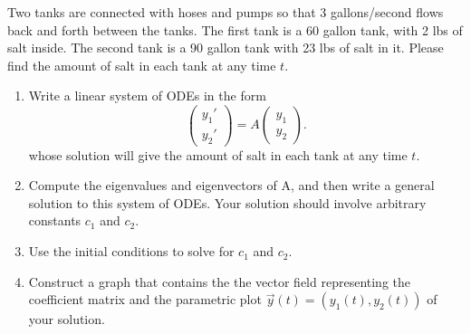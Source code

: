\begin{problem}
 Two tanks are connected with hoses and pumps so that 3 gallons/second flows back and forth between the tanks.  The first tank is a 60 gallon tank, with 2 lbs of salt inside.  The second tank is a 90 gallon tank with 23 lbs of salt in it. Please find the amount of salt in each tank at any time $t$. 
\begin{enumerate}
 \item Write a linear system of ODEs in the form 
$$
\begin{pmatrix}
 y_1'\\y_2'
\end{pmatrix}
=
A
\begin{pmatrix}
 y_1\\y_2
\end{pmatrix}.
$$
whose solution will give the amount of salt in each tank at any time $t$.
 \item Compute the eigenvalues and eigenvectors of A, and then write a general solution to this system of ODEs. Your solution should involve arbitrary constants $c_1$ and $c_2$.
 \item Use the initial conditions to solve for $c_1$ and $c_2$.
 \item {}%
Construct a graph that contains the the vector field representing the coefficient matrix and the parametric plot $\vec y(t) = (y_1(t),y_2(t))$ of your solution.
\end{enumerate}

\end{problem}


